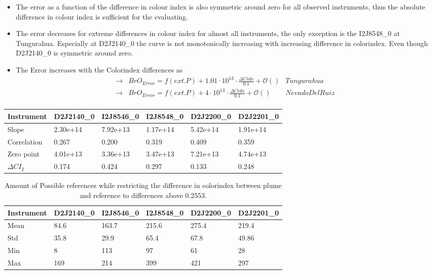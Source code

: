 \documentclass  [
  paper    = a4,
  BCOR     = 10mm,
  twoside,
  fontsize = 12pt,
  fleqn,
  toc      = bibnumbered,
  toc      = listofnumbered,
  numbers  = noendperiod,
  headings = normal,
  listof   = leveldown,
  version  = 3.03
]                                       {scrreprt}
\begin{document}
	\begin{itemize}
		\item The   error as a function of the difference in colour index is also symmetric around zero for all observed instruments, thus the absolute difference in colour index is sufficient for the evaluating.
		\item The   error decreases for extreme differences in colour index for almost all instruments, the only exception is the  I2J8548\_0 at Tungurahua. Especially at D2J2140\_0 the curve is not monotonically increasing with increasing difference in colorindex. Even though  D2J2140\_0 is symmetric around zero.
	\end{itemize}
	\begin{itemize}
		\item 	The  Error increases with the Colorindex differences as \\
		\begin{align*}
		\rightarrow&  BrO_{Error} = f(ext. P)+ 1.01\cdot10^{13}\cdot\frac{\Delta Cidx}{0.1} + \mathcal{O}\left(\right) & Tungurahua\\
		\rightarrow&  BrO_{Error} = f(ext. P)+  4\cdot10^{13}\cdot\frac{\Delta Cidx}{0.1} + \mathcal{O}\left(\right) & Nevado Del Ruiz\\
		\end{align*}
	\end{itemize}
	\begin{table}[h]
	\begin{tabular}{|p{2cm}|p{2cm}|p{2cm}|p{2cm}|p{2cm}|p{2cm}|}
			Instrument	&D2J2140\_0&I2J8546\_0& I2J8548\_0&D2J2200\_0&D2J2201\_0\\
			\toprule
			Slope&2.30e+14 &7.92e+13 &1.17e+14 &5.42e+14&1.91e+14\\
			\midrule
			Correlation&
			0.267&
			0.200&
			0.319&
			0.409&
			0.359\\
			\midrule
			Zero point&4.01e+13&3.36e+13&3.47e+13& 7.21e+13& 4.74e+13\\
						\midrule
			$\Delta CI_{2}$&0.174&0.424&0.297&0.133&0.248\\
			\bottomrule
		\end{tabular}
		\label{tab:colidxcalc}
	\end{table}

	\begin{table}[h]
	\begin{tabular}{|p{2cm}|p{2cm}|p{2cm}|p{2cm}|p{2cm}|p{2cm}|}
		Instrument	&D2J2140\_0&I2J8546\_0& I2J8548\_0&D2J2200\_0&D2J2201\_0\\
		\toprule
		Mean&84.6&163.7 &215.6&275.4&219.4\\
		\midrule
		Std&
		35.8&
		29.9&
		65.4&
		67.8&
		49.86\\
		\midrule
		Min&8&113&97&61 &28\\
		\midrule
		Max&169&214&399&421 &297 \\
		\bottomrule
	\end{tabular}
	\caption{Amount of Possible references while restricting the difference in colorindex  between plume and reference to differences above 0.2553.}
	\label{tab:colidxres}
\end{table}	
\end{document}
